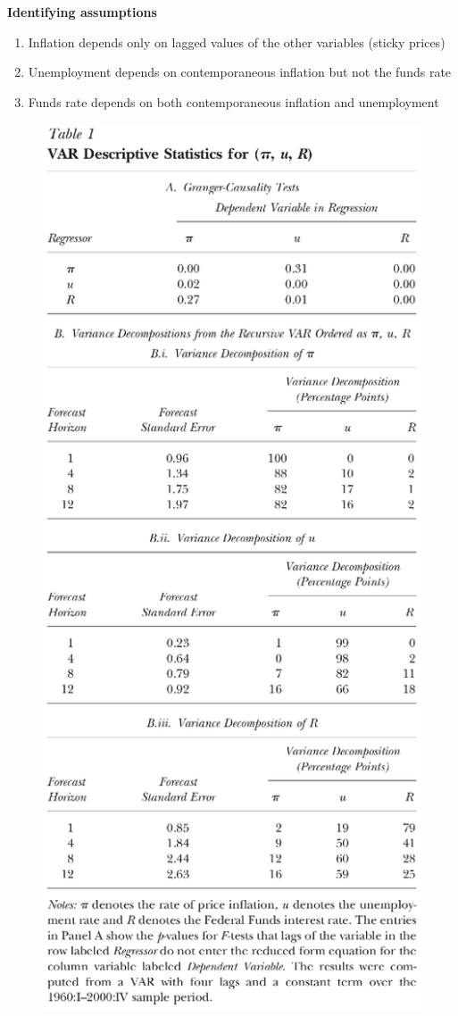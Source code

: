 \documentclass{beamer}
\begin{document}
\begin{frame}
  \textbf{Identifying assumptions}
\begin{enumerate}
  \item Inflation depends only on lagged values of the other variables (sticky prices)
  \item Unemployment depends on contemporaneous inflation but not the funds rate
  \item Funds rate depends on both contemporaneous inflation and unemployment
\end{enumerate}
\end{frame}

\begin{frame}
  \begin{figure}
    \includegraphics[scale=.4]{stock_watson.eps}

\end{figure}
\end{frame}
\end{document}
